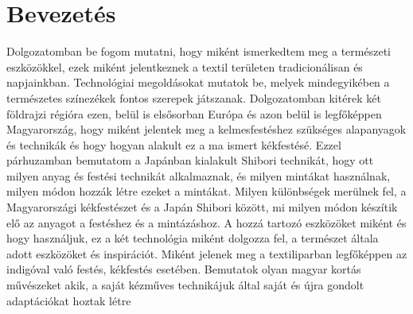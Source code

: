\chapter{Bevezetés}
Dolgozatomban be fogom mutatni, hogy miként ismerkedtem  meg a természeti eszközökkel, ezek  miként jelentkeznek a textil területen tradicionálisan és napjainkban.
Technológiai megoldásokat mutatok be, melyek mindegyikében a természetes színezékek fontos szerepek játszanak.
Dolgozatomban kitérek két földrajzi régióra ezen, belül is elsősorban Európa és azon belül is legfőképpen Magyarország, hogy  miként jelentek meg a kelmesfestéshez szükséges alapanyagok és technikák és hogy hogyan alakult ez a ma ismert kékfestésé. Ezzel párhuzamban bemutatom a Japánban kialakult Shibori technikát, hogy ott milyen anyag és festési technikát alkalmaznak, és milyen mintákat használnak, milyen módon hozzák létre ezeket a mintákat.
Milyen különbségek merülnek fel, a Magyarországi kékfestészet és a Japán Shibori között, mi milyen módon készítik elő az anyagot a festéshez és a mintázáshoz.
A hozzá tartozó eszközöket miként és hogy használjuk, 
ez a két technológia miként dolgozza fel, a természet általa adott eszközöket és inspirációt.
Miként jelenek meg a textiliparban legfőképpen az indigóval való festés, kékfestés esetében.
Bemutatok olyan magyar kortás művészeket akik, a saját kézműves technikájuk által saját és újra gondolt adaptációkat hoztak létre 